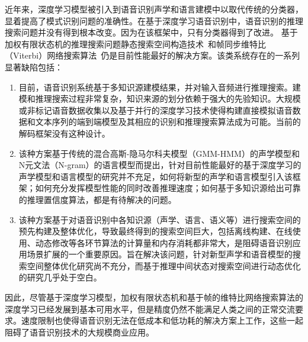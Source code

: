 近年来，深度学习模型被引入到语音识别声学和语言建模中以取代传统的分类器，显着提高了模式识别问题的准确性。在基于深度学习语音识别中，语音识别的推理搜索问题并没有得到根本改变。因为在该框架中，只有分类器得到了改进。
基于加权有限状态机的推理搜索问题静态搜索空间构造技术~\cite{mohri2002weighted}和帧同步维特比（Viterbi）网络搜索算法~\cite{forney1973viterbi}仍是目前性能最好的解决方案。该类系统存在的一系列显著缺陷包括：
\begin{enumerate}
\item 目前，语音识别系统基于多知识源建模结果，并对输入音频进行推理搜索。建模和推理搜索过程非常复杂，知识来源的划分依赖于强大的先验知识。大规模或非标记语音数据收集以及基于并行的深度学习技术使得构建直接模拟语音数据和文本序列的端到端模型及其相应的识别和推理搜索算法成为可能。当前的解码框架没有这种设计。
\item 
该种方案基于传统的混合高斯-隐马尔科夫模型（GMM-HMM）的声学模型和N元文法（N-gram）的语言模型而提出，针对目前性能最好的基于深度学习的声学模型和语言模型的研究并不充足，如何将新型的声学和语言模型引入该框架；如何充分发挥模型性能的同时改善推理速度；如何基于多知识源给出可靠的推理置信度算法，都是有待解决的问题。
\item 
该种方案基于对语音识别中各知识源（声学、语言、语义等）进行搜索空间的预先构建及整体优化，导致最终得到的搜索空间巨大，包括离线构建、在线使用、动态修改等各环节算法的计算量和内存消耗都非常大，是阻碍语音识别应用场景扩展的一个重要原因。旨在解决该问题，针对新型声学和语音模型的搜索空间整体优化研究尚不充分，而基于推理中间状态对搜索空间进行动态优化的研究几乎处于空白。
\end{enumerate}
因此，尽管基于深度学习模型，加权有限状态机和基于帧的维特比网络搜索算法的深度学习已经发展到基本可用水平，但是精度仍然不能满足人类之间的正常交流要求。速度限制也使得语音识别无法在低成本和低功耗的解决方案上工作，这些一起阻碍了语音识别技术的大规模商业应用。

